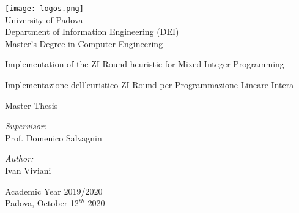\begin{titlepage}
	
    \frontmatter
    
    \begin{center}
        \texttt{[image: logos.png]}
        \\
        \vspace{1cm}
        \textsf{\Large University of Padova} \\
        \vspace{0.5cm}
        \textsf{\Large Department of Information Engineering (DEI)} \\
        \vspace{0.5cm} 
        \textsf{\Large Master's Degree in Computer Engineering} \\ %
        \vspace{0.8cm}
        \Huge \doublespacing \bfseries \begin{spacing}{1}{\textsf{Implementation of the ZI-Round heuristic for Mixed Integer Programming}}\end{spacing}
        \hfill
        \Large \bfseries \begin{spacing}{1}{\textsf{Implementazione dell'euristico ZI-Round per Programmazione Lineare Intera}}\end{spacing}
        \vspace{1.12cm}
        \Large \bfseries \begin{spacing}{1}{\textsf{Master Thesis}}\end{spacing}
        \vspace{0.5cm}
        \begin{flushleft} 
            \large \emph{Supervisor:} \\
            \textsf{Prof. Domenico Salvagnin}
        \end{flushleft}
        \begin{flushright} 
            \large \emph{Author:} \\
            \textsf{Ivan Viviani}
        \end{flushright}
        \hfill
        \vfill
        \small \textsf{Academic Year 2019/2020} \\
        \textsf{Padova, October 12$^{th}$ 2020}
    \end{center}
    
\end{titlepage}